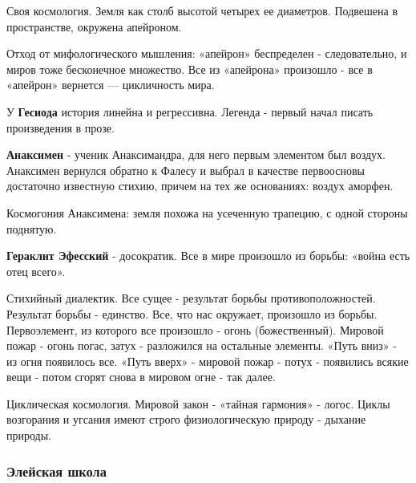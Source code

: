 \documentclass{article}
\begin{document}
\begin{flushleft}
\hfill

Своя космология. Земля как столб высотой четырех ее диаметров. Подвешена в пространстве, окружена апейроном.

\hfill

Отход от мифологического мышления: «апейрон» беспределен - следовательно, и миров тоже бесконечное множество. Все из «апейрона» произошло - все в «апейрон» вернется — цикличность мира.

\hfill

У \textbf{Гесиода} история линейна и регрессивна. Легенда - первый начал писать произведения в прозе.

\hfill

\textbf{Анаксимен} - ученик Анаксимандра, для него первым элементом был воздух. Анаксимен вернулся обратно к Фалесу и выбрал в качестве первоосновы достаточно известную стихию, причем на тех же основаниях: воздух аморфен.

\hfill

Космогония Анаксимена: земля похожа на усеченную трапецию, с одной стороны поднятую.

\hfill

\textbf{Гераклит Эфесский} - досократик. Все в мире произошло из борьбы: «война есть отец всего».

\hfill

Стихийный диалектик. Все сущее - результат борьбы противоположностей. Результат борьбы - единство. Все, что нас окружает, произошло из борьбы. Первоэлемент, из которого все произошло - огонь (божественный). Мировой пожар - огонь погас, затух - разложился на остальные элементы. «Путь вниз» - из огня появилось все. «Путь вверх» - мировой пожар - потух - появились всякие вещи - потом сгорят снова в мировом огне - так далее.

\hfill

Циклическая космология. Мировой закон - «тайная гармония» - логос. Циклы возгорания и угсания имеют строго физиологическую природу - дыхание природы.

\end{flushleft}

\subsubsection{Элейская школа}
\end{document}
